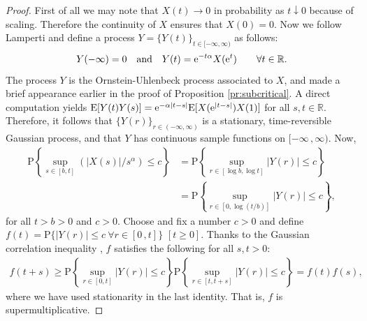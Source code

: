 \documentclass[reqno]{amsart}
\newcommand{\<}{\langle}
\renewcommand{\>}{\rangle}
\newcommand{\R}{\mathbb{R}}
\renewcommand{\P}{\mathrm{P}}
\newcommand{\E}{\mathrm{E}}
\newcommand{\1}{\mathbb{1}}
\newcommand{\e}{{\rm e}}
\renewcommand{\ge}{\geqslant}
\renewcommand{\le}{\leqslant}
\theoremstyle{definition}
\numberwithin{equation}{section}
\begin{document}
\begin{proof}
	First of all we may note that $X(t)\to0$ in probability as $t\downarrow0$ 
	because of scaling. Therefore the continuity of $X$ ensures that $X(0)=0$.
	Now we follow Lamperti \cite{Lamperti62}
	and define a process $Y=\{Y(t)\}_{t\in[-\infty,\infty)}$ as follows:
	\begin{equation}\label{Y}
		Y(-\infty)=0\quad\text{and}\quad
		Y(t) = \e^{-t\alpha} X(\e^t)\qquad\forall t\in\R.
	\end{equation}
	The process $Y$ is the Ornstein-Uhlenbeck process associated to $X$,
	and made a brief appearance earlier in the proof of 
	Proposition \ref{pr:subcritical}.
	A direct computation yields
	$\E[Y(t)Y(s)]  = \e^{-\alpha |t-s|}\E[X(\e^{|t-s|})X(1)]$
	for all $s,t\in\R.$
	Therefore, it follows that $\{Y(r)\}_{r\in(-\infty,\infty)}$ is a stationary,
	time-reversible Gaussian process, and that $Y$ has continuous sample functions
	on $[-\infty\,,\infty)$. Now,
	\begin{align*}\textstyle
		\P\left\{\sup_{s\in[b,t]} \left( |X(s)|/s^\alpha\right) \le c\right\}
			&\textstyle=\P\left\{\sup_{r\in[\log b,\log t]}|Y(r)|\le c\right\}\\
		&\textstyle=\P\left\{\sup_{r\in[0,\log(t/b)]}|Y(r)|\le c\right\},
	\end{align*}
	for all $t>b>0$ and $c>0$.
	Choose and fix a number $c>0$ and define
	$f(t) = \P\{ |Y(r)|\le c\ \forall r\in[0\,,t]\}$ $[t\ge 0].$
	Thanks to the Gaussian correlation inequality \cite{Royen,LatalaMatlak}, 
	$f$ satisfies the following
	for all $s,t>0$:
	\begin{align*}\textstyle
		f(t+s) 
		\ge \P\left\{\sup_{r\in[0,t]}|Y(r)|\le c\right\}
		\P\left\{\sup_{r\in[t,t+s]}|Y(r)|\le c\right\} = f(t)f(s),
	\end{align*}
	where we have used stationarity in the last identity. 
	That is, $f$ is supermultiplicative.  
	

\end{proof}
\end{document}
